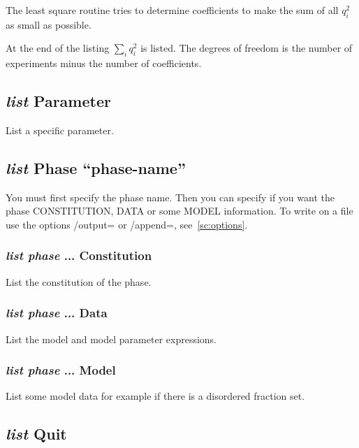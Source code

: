\documentclass[11pt]{article}
\begin{document}
The least square routine tries to determine coefficients to make the
sum of all $q_i^2$ as small as possible.

At the end of the listing $\sum_i q_i^2$ is listed.  The degrees of
freedom is the number of experiments minus the number of coefficients.

\hypertarget{List parameter}{}
\subsection{{\em list} Parameter}

List a specific parameter.

\hypertarget{List phase}{}
\hypertarget{List what for}{}
\subsection{{\em list} Phase ``phase-name''}

You must first specify the phase name.  Then you can specify if you
want the phase CONSTITUTION, DATA or some MODEL information.  To write
on a file use the options /output= or /append=, see~\ref{sc:options}.

\subsubsection{{\em list phase} ... Constitution}

List the constitution of the phase.

\subsubsection{{\em list phase} ... Data}

List the model and model parameter expressions.

\subsubsection{{\em list phase} ... Model}

List some model data for example if there is a disordered fraction set.

\subsection{{\em list} Quit}
\end{document}
